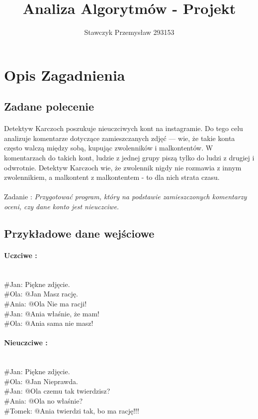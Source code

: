 \documentclass[11pt]{article} %
\title{Analiza Algorytmów - Projekt}
\author{Stawczyk Przemysław 293153}
\date{} %
\begin{document}
\maketitle

\section{Opis Zagadnienia}
\subsection{Zadane polecenie}
\paragraph{}
    Detektyw Karczoch poszukuje nieuczciwych kont na instagramie. Do tego celu analizuje komentarze dotyczące zamieszczanych zdjęć — wie, że takie konta często walczą między sobą, kupując zwolenników i malkontentów. W komentarzach do takich kont, ludzie z jednej grupy piszą tylko do ludzi z drugiej i odwrotnie. Detektyw Karczoch wie, że zwolennik nigdy nie rozmawia z innym zwolennikiem, a malkontent z malkontentem - to dla nich strata czasu.
\paragraph{}    
	Zadanie : \textsl{Przygotować program, który na podstawie zamieszczonych komentarzy oceni, czy dane konto jest nieuczciwe.}

\subsection{Przykładowe dane wejściowe}

\paragraph{Uczciwe :}
\begin{texttt}\\
  \#Jan: Piękne zdjęcie.\\
  \#Ola: @Jan Masz rację.\\
  \#Ania: @Ola Nie ma racji!\\
  \#Jan: @Ania właśnie, że mam!\\
  \#Ola: @Ania sama nie masz!\\
\end{texttt}
\paragraph{Nieuczciwe : }
\begin{texttt}\\
   \#Jan: Piękne zdjęcie.\\
   \#Ola: @Jan Nieprawda.\\
   \#Jan: @Ola czemu tak twierdzisz?\\
   \#Ania: @Ola no właśnie?\\
   \#Tomek: @Ania twierdzi tak, bo ma rację!!!\\
\end{texttt}
\end{document}
